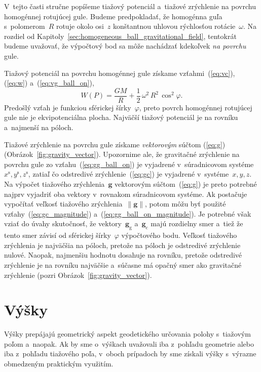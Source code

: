 \documentclass[a4paper, 12pt]{book}
\newcommand{\gidx}{\mathrm g}
\newcommand{\cidx}{\mathrm c}
\let\vec\mathbf
\begin{document}
V~tejto časti stručne popíšeme tiažový potenciál a~tiažové zrýchlenie na 
povrchu homogénnej rotujúcej gule.  Budeme predpokladať, že homogénna guľa 
s~polomerom~$R$ rotuje okolo osi~$z$ konštantnou uhlovou rýchlosťou 
rotácie~$\omega$.  Na rozdiel od 
Kapitoly~\ref{sec:homogeneous_ball_gravitational_field}, tentokrát budeme 
uvažovať, že výpočtový bod sa môže nachádzať kdekoľvek \emph{na povrchu} gule.

Tiažový potenciál na povrchu homogénnej gule získame vzťahmi~(\ref{eq:vc}), 
(\ref{eq:w}) a~(\ref{eq:vg_ball_on}),
%
\begin{equation}
\label{eq:w_ball_on}
W(P) = \frac{GM}{R} + \frac{1}{2} \, \omega^2 \, R^2 \, \cos^2\varphi{.}
\end{equation}
%
Predošlý vzťah je funkciou sférickej šírky~$\varphi$, preto povrch homogénnej 
rotujúcej gule nie je ekvipotenciálna plocha.  Najväčší tiažový potenciál je na 
rovníku a~najmenší na póloch.

Tiažové zrýchlenie na povrchu gule získame \emph{vektorovým} súčtom 
(\ref{eq:g}) (Obrázok~\ref{fig:gravity_vector}).  Upozornime ale, že gravitačné 
zrýchlenie na povrchu gule zo vzťahu~(\ref{eq:gg_ball_on}) je vyjadrené 
v~súradnicovom systéme~$x^\mathrm{s}, y^\mathrm{s}, z^\mathrm{s}$, zatiaľ čo 
odstredivé zrýchlenie~(\ref{eq:gc}) je vyjadrené v~systéme~$x, y, z$.  Na 
výpočet tiažového zrýchlenia~$\vec g$ vektorovým súčtom~(\ref{eq:g}) je preto 
potrebné najprv vyjadriť oba vektory v~rovnakom súradnicovom systéme.  Ak 
postačuje vypočítať veľkosť tiažového zrýchlenia~$\| \vec g \|$, potom môžu byť 
použité vzťahy~(\ref{eq:gc_magnitude}) a~(\ref{eq:gg_ball_on_magnitude}).  Je 
potrebné však vziať do úvahy skutočnosť, že vektory~$\vec g_\gidx$ a~$\vec 
g_\cidx$ majú rozdielny smer a~tiež že tento smer závisí od sférickej 
šírky~$\varphi$ výpočtového bodu.  Veľkosť tiažového zrýchlenia je najväčšia na 
póloch, pretože na póloch je odstredivé zrýchlenie nulové.  Naopak, najmenšiu 
hodnotu dosahuje na rovníku, pretože odstredivé zrýchlenie je na rovníku 
najväčšie a~súčasne má opačný smer ako gravitačné zrýchlenie (pozri 
Obrázok~\ref{fig:gravity_vector}).

\section{Výšky}
\label{sec:heights}

Výšky prepájajú geometrický aspekt geodetického určovania polohy s~tiažovým 
poľom a~naopak.  Ak by sme o~výškach uvažovali iba z~pohľadu geometrie alebo 
iba z~pohľadu tiažového poľa, v~oboch prípadoch by sme získali výšky s~výrazne 
obmedzeným praktickým využitím.
\end{document}
